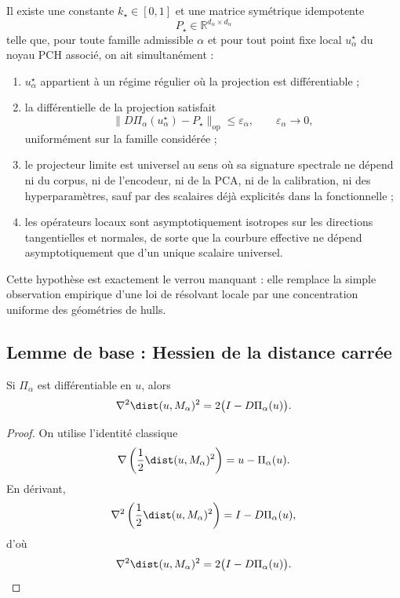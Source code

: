 \begin{assumption}
Il existe une constante $k_\star\in[0,1]$ et une matrice symétrique idempotente
\[
P_\star \in \mathbb R^{d_\alpha\times d_\alpha}
\]
telle que, pour toute famille admissible $\alpha$ et pour tout point fixe local $u_\alpha^\star$ du noyau PCH associé, on ait simultanément :

\begin{enumerate}
\item[(i)] $u_\alpha^\star$ appartient à un régime régulier où la projection est différentiable ;

\item[(ii)] la différentielle de la projection satisfait
\[
\|D\Pi_\alpha(u_\alpha^\star)-P_\star\|_{\mathrm{op}}
\le \varepsilon_\alpha,
\qquad \varepsilon_\alpha\to 0,
\]
uniformément sur la famille considérée ;

\item[(iii)] le projecteur limite est universel au sens où sa signature spectrale ne dépend ni du corpus, ni de l'encodeur, ni de la PCA, ni de la calibration, ni des hyperparamètres, sauf par des scalaires déjà explicités dans la fonctionnelle ;

\item[(iv)] les opérateurs locaux sont asymptotiquement isotropes sur les directions tangentielles et normales, de sorte que la courbure effective ne dépend asymptotiquement que d'un unique scalaire universel.
\end{enumerate}
\end{assumption}

Cette hypothèse est exactement le verrou manquant : elle remplace la simple observation empirique d'une loi de résolvant locale par une concentration uniforme des géométries de hulls.

\subsection{Lemme de base : Hessien de la distance carrée}

\begin{lemma}
Si $\Pi_\alpha$ est différentiable en $u$, alors
\[
\nabla^2 \dist(u,M_\alpha)^2
=
2\bigl(I-D\Pi_\alpha(u)\bigr).
\]
\end{lemma}

\begin{proof}
On utilise l'identité classique
\[
\nabla\left(\frac12 \dist(u,M_\alpha)^2\right)=u-\Pi_\alpha(u).
\]
En dérivant,
\[
\nabla^2\left(\frac12 \dist(u,M_\alpha)^2\right)
=
I-D\Pi_\alpha(u),
\]
d'où
\[
\nabla^2 \dist(u,M_\alpha)^2
=
2\bigl(I-D\Pi_\alpha(u)\bigr).
\]
\end{proof}


